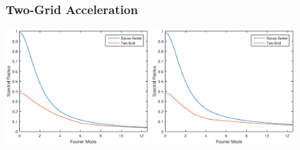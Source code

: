 \documentclass[compress,10pt]{beamer}
\begin{document}
\begin{frame}[t]\frametitle{Two-Grid Acceleration}
\begin{block}{}{\small

}\end{block}
\centering
\includegraphics[width=0.4\textwidth]{images/P0_Fourier_69G.eps} \hspace{2mm}
\includegraphics[width=0.4\textwidth]{images/P1_Fourier_69G.eps}
\end{frame}
\end{document}
